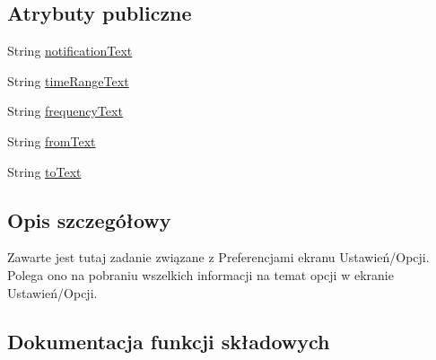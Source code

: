 \subsection*{Atrybuty publiczne}
\begin{DoxyCompactItemize}
\item 
String \hyperlink{classpl_1_1edu_1_1uwb_1_1mobiuwb_1_1services_1_1notification_1_1data_initialize_1_1tasks_1_1sharfea0e1fb4d2269185de585e411b5e8b3_a0ebadfb312c3df9df945e83f500ac58e}{notification\+Text}
\item 
String \hyperlink{classpl_1_1edu_1_1uwb_1_1mobiuwb_1_1services_1_1notification_1_1data_initialize_1_1tasks_1_1sharfea0e1fb4d2269185de585e411b5e8b3_adbbeb4627e664380ffba97fa3e66fdad}{time\+Range\+Text}
\item 
String \hyperlink{classpl_1_1edu_1_1uwb_1_1mobiuwb_1_1services_1_1notification_1_1data_initialize_1_1tasks_1_1sharfea0e1fb4d2269185de585e411b5e8b3_aa279d7c6e7f57a03ad1d626dd0813022}{frequency\+Text}
\item 
String \hyperlink{classpl_1_1edu_1_1uwb_1_1mobiuwb_1_1services_1_1notification_1_1data_initialize_1_1tasks_1_1sharfea0e1fb4d2269185de585e411b5e8b3_a703c17ff1648855f63e6bb868cdbd3af}{from\+Text}
\item 
String \hyperlink{classpl_1_1edu_1_1uwb_1_1mobiuwb_1_1services_1_1notification_1_1data_initialize_1_1tasks_1_1sharfea0e1fb4d2269185de585e411b5e8b3_a3724e22d82556e8a58aeb6aa084729fa}{to\+Text}
\end{DoxyCompactItemize}


\subsection{Opis szczegółowy}
Zawarte jest tutaj zadanie związane z Preferencjami ekranu Ustawień/\+Opcji. Polega ono na pobraniu wszelkich informacji na temat opcji w ekranie Ustawień/\+Opcji. 

\subsection{Dokumentacja funkcji składowych}
\hypertarget{classpl_1_1edu_1_1uwb_1_1mobiuwb_1_1services_1_1notification_1_1data_initialize_1_1tasks_1_1sharfea0e1fb4d2269185de585e411b5e8b3_aadd06cdab6556991272c607078a54daf}{}
